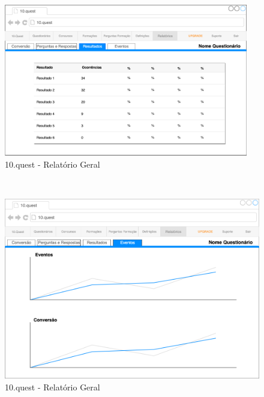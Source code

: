 \begin{figure}[ht!]
	\begin{center}
		\includegraphics[width=0.95\textwidth]{img/prototipos/r3.png}
		\caption{10.quest - Relatório Geral}
		\label{10q-r3}
	\end{center}
\end{figure}
\mbox{ }
\begin{figure}[ht!]
	\begin{center}
		\includegraphics[width=1\textwidth]{img/prototipos/r4.png}
		\caption{10.quest - Relatório Geral}
		\label{10q-r4}
	\end{center}
\end{figure}

\newpage

